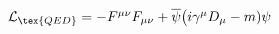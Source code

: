 \documentclass[preview]{standalone}
\begin{document}
\begin{center}
$\mathcal{L}_\tex{QED} = -F^{\mu \nu}F_{\mu \nu} + \overline{\psi} \big( i \gamma ^\mu D_\mu - m)\psi$
\end{center}
\end{document}
